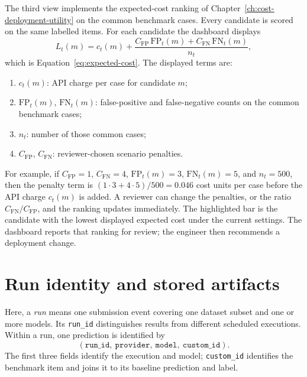 The third view implements the expected-cost ranking of
Chapter~\ref{ch:cost-deployment-utility} on the common benchmark cases.
Every candidate is scored on the same labelled items.
For each candidate the dashboard displays
\begin{equation}
L_t(m)
=
c_t(m)
+
\frac{
C_{\mathrm{FP}}\,\mathrm{FP}_t(m)
+
C_{\mathrm{FN}}\,\mathrm{FN}_t(m)
}{n_t},
\label{eq:dashboard-expected-cost}
\end{equation}
which is Equation~\eqref{eq:expected-cost}.
The displayed terms are:
\begin{enumerate}
    \item \(c_t(m)\): API charge per case for candidate \(m\);
    \item \(\mathrm{FP}_t(m)\), \(\mathrm{FN}_t(m)\): false-positive and false-negative counts
    on the common benchmark cases;
    \item \(n_t\): number of those common cases;
    \item \(C_{\mathrm{FP}}\), \(C_{\mathrm{FN}}\): reviewer-chosen scenario penalties.
\end{enumerate}
For example, if \(C_{\mathrm{FP}}=1\), \(C_{\mathrm{FN}}=4\),
\(\mathrm{FP}_t(m)=3\), \(\mathrm{FN}_t(m)=5\), and \(n_t=500\),
then the penalty term is
\((1\cdot 3 + 4\cdot 5)/500 = 0.046\) cost units per case
before the API charge \(c_t(m)\) is added.
A reviewer can change the penalties, or the ratio \(C_{\mathrm{FN}}/C_{\mathrm{FP}}\),
and the ranking updates immediately.
The highlighted bar is the candidate with the lowest displayed expected cost
under the current settings.
The dashboard reports that ranking for review;
the engineer then recommends a deployment change.

\section{Run identity and stored artifacts}
\label{sec:artifacts-data-flow}
Here, a \emph{run} means one submission event covering one dataset subset and one or more models.
Its \texttt{run\_id} distinguishes results from different scheduled executions.
Within a run, one prediction is identified by
\[
(\texttt{run\_id},\ \texttt{provider},\ \texttt{model},\ \texttt{custom\_id}).
\]
The first three fields identify the execution and model;
\texttt{custom\_id} identifies the benchmark item and joins it to its baseline prediction and label.

